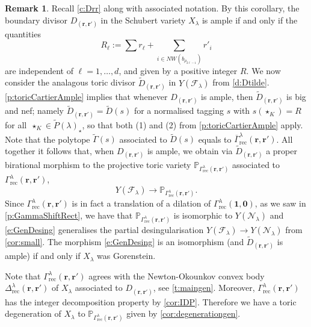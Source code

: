 \documentclass{amsart}
\theoremstyle{definition}
\newtheorem{remark}[thm]{Remark}
\numberwithin{equation}{section}
\newcommand{\FF}{\mathcal{F}}
\newcommand{\CC}{\mathcal{N}}
\newcommand{\rect}{\mathrm{rec}}
\begin{document}
\begin{remark}
Recall \cref{c:Drr} along with associated notation. By this corollary, the boundary divisor $D_{(\mathbf r,\mathbf r')}$ in the Schubert variety $X_\lambda$ is ample if and only if the quantities 
\[
R_\ell:=\sum r_\ell+\sum_{i\in NW(b_{\rho_{2\ell-1}})}r'_i 
\]
are independent of $\ell=1,\dotsc, d$, and given by a positive integer $R$. We now consider the analagous toric divisor $\widetilde D_{(\mathbf r,\mathbf {r'})}$ in $Y(\FF_{\lambda})$ from \cref{d:Dtilde}.  \cref{p:toricCartierAmple} implies that whenever $D_{(\mathbf r,\mathbf r')}$ is ample, then  $\widetilde D_{(\mathbf r,\mathbf {r'})}$ is big and nef; namely $\widetilde D_{(\mathbf r,\mathbf {r'})}=\widetilde D(s)$ for a normalised tagging $s$ with $s(\star_K)=R$ for all~$\star_K\in \widetilde P(\lambda)_\star$, so that both (1) and (2) from \cref{p:toricCartierAmple} apply. 
Note that the polytope $\widetilde \Gamma(s)$ associated  to $\widetilde D(s)$ equals to $\overline\Gamma^\lambda_\rect(\mathbf r,\mathbf r')$. All together it follows that, when $D_{(\mathbf r,\mathbf r')}$ is ample, we obtain via $\widetilde D_{(\mathbf r,\mathbf {r'})}$ a proper birational morphism to the projective toric variety $\mathbb P_{\Gamma^\lambda_\rect(\mathbf r,\mathbf r')}$ associated to
$\Gamma^\lambda_\rect(\mathbf r,\mathbf r')$,  
\begin{equation}\label{e:GenDesing}
Y(\FF_{\lambda})\to \mathbb P_{\Gamma^\lambda_\rect(\mathbf r,\mathbf r')}.
\end{equation}
 Since $\Gamma^\lambda_{\rect}(\mathbf r,\mathbf r')$ is in fact a translation of a dilation of $\Gamma^\lambda_{\rect}(\mathbf 1,\mathbf 0)$, as we saw in \cref{p:GammaShiftRect}, we have that $\mathbb P_{\Gamma^\lambda_\rect(\mathbf r,\mathbf r')}$ is isomorphic to  $Y(\CC_\lambda)$ and \eqref{e:GenDesing} generalises the partial desingularisation $Y(\FF_\lambda)\to Y(\CC_\lambda)$ from \cref{cor:small}. The morphism \eqref{e:GenDesing} is an isomorphism (and  $\widetilde D_{(\mathbf r,\mathbf {r'})}$ is ample) if and only if  $X_\lambda$ was Gorenstein. 

Note  that $\Gamma^\lambda_{\rect}(\mathbf r,\mathbf r')$ agrees with the Newton-Okounkov convex body $\Delta_\rect^\lambda(\mathbf r,\mathbf r')$ of $X_\lambda$ associated to $D_{(\mathbf r,\mathbf r')}$, see \cref{t:maingen}. Moreover, $\Gamma^\lambda_{\rect}(\mathbf r,\mathbf r')$ has the integer decomposition property by  \cref{cor:IDP}. Therefore we have a toric degeneration of $X_\lambda$ to $\mathbb P_{\Gamma^\lambda_\rect(\mathbf r,\mathbf r')}$ given by \cref{cor:degenerationgen}.
\end{remark}
\end{document}

